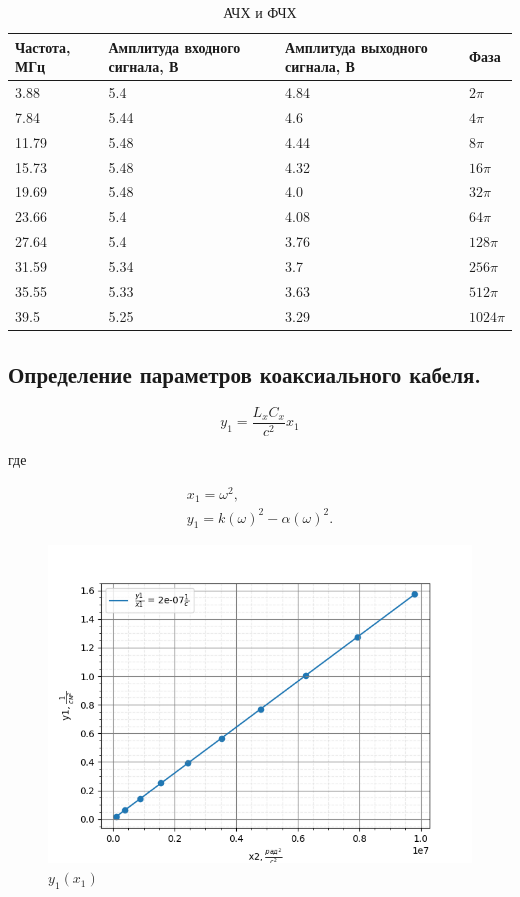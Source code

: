 \documentclass[a4paper,12 pt]{article}
\begin{document}
\begin{table}[H]
    \centering
    \begin{tabular}{|p{2 cm}|p{2 cm}|p{2 cm}|p{2 cm}|}
    \hline
       Частота, МГц  &  Амплитуда входного сигнала, В & Амплитуда выходного сигнала, В & Фаза  \\
    \hline
3.88  &  5.4  &  4.84  & $2\pi$ \\
\hline
7.84  &  5.44  &  4.6  & $4\pi$ \\
\hline
11.79  &  5.48  &  4.44  & $8\pi$ \\
\hline
15.73  &  5.48  &  4.32  & $16\pi$ \\
\hline
19.69  &  5.48  &  4.0  & $32\pi$ \\
\hline
23.66  &  5.4  &  4.08  & $64\pi$ \\
\hline
27.64  &  5.4  &  3.76  & $128\pi$ \\
\hline
31.59  &  5.34  &  3.7  & $256\pi$ \\
\hline
35.55  &  5.33  &  3.63  & $512\pi$ \\
\hline
39.5  &  5.25  &  3.29  & $1024\pi$ \\
\hline
    \end{tabular}
    \caption{АЧХ и ФЧХ}
    \label{tab:my_label}
\end{table}

\subsection{Определение параметров коаксиального кабеля.}


\begin{equation*}
y_{1}=\frac{L_{x} C_{x}}{c^{2}} x_{1} \tag{30}
\end{equation*}


где


\begin{gather*}
x_{1}=\omega^{2},  \tag{31}\\
y_{1}=k(\omega)^{2}-\alpha(\omega)^{2} . \tag{32}
\end{gather*}

\begin{figure}[H]
    \centering
    \includegraphics[scale=0.7]{y1(x1).png}
    \caption{$y_1(x_1)$}
    \label{fig:enter-label}
\end{figure}
\end{document}

